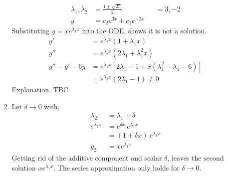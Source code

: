 \begin{enumerate}
\begin{enumerate}
\begin{align}
                        \lambda_{1}, \lambda_{2} & = \frac{1 \pm \sqrt{25}}{2}  &
                                                 & = 3, -2                        \\
                        y                        & = c_{2}e^{3x} + c_{1}e^{-2x}
                    \end{align}
                    Substituting $y = xe^{\lambda_{1}x}$ into the ODE, shows it is not
                    a solution.
                    \begin{align}
                        y'          & = e^{\lambda_{1}x}
                        (1 + \lambda_{1}x)                \\
                        y''         & = e^{\lambda_{1}x}
                        (2\lambda_{1} + \lambda_{1}^{2}x) \\
                        y'' -y' -6y & = e^{\lambda_{1}x}
                        \left[ 2\lambda_{1} - 1 + x(\lambda_{1}^{2} - \lambda_{1} - 6)
                        \right]                           \\
                                    & = e^{\lambda_{1}x}
                        (2\lambda_{1} - 1) \neq 0
                    \end{align}
                    Explanation. TBC
              \item Let $ \delta \to 0 $ with,
                    \begin{align}
                        \lambda_{2}       & = \lambda_{1} + \delta             \\
                        e^{\lambda _{2}x} & = e^{\delta x}\ e^{\lambda_{1}x}   \\
                                          & = (1 + \delta x)\ e^{\lambda_{1}x} \\
                        y_{2}             & = xe^{\lambda_{1}x}
                    \end{align}
                    Getting rid of the additive component and scalar $ \delta $, leaves
                    the second solution $ xe^{\lambda_{1}x} $.
                    The series approximation only holds for $ \delta \to 0 $.
          \end{enumerate}
\end{enumerate}
